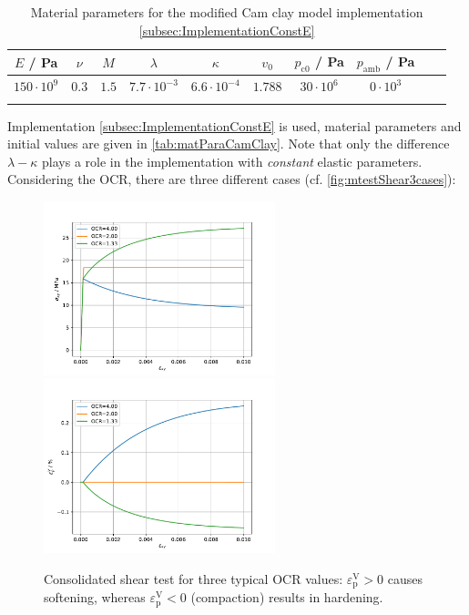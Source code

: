 \documentclass[paper=a4, twoside, pagesize]{scrartcl}
\renewcommand{\c}{\text{c}}
\newcommand{\p}{\text{p}}
\newcommand{\minus}{-}
\begin{document}
\begin{table}[h!]
  \centering
  \caption{Material parameters for the modified Cam clay model implementation \ref{subsec:ImplementationConstE}}
  \label{tab:matParaCamClay}
  \begin{tabular}{c c c c c c c c c c}
  \firsthline
    {$E$} / Pa & {$\nu$} & {$M$} & {$\lambda$} & {$\kappa$} & {$v_0$} & {$p_{\c0}$} / Pa & {$p_\text{amb}$} / Pa\\
    \hline
    $150\cdot10^{9}$ & $0.3$ & $1.5$ & $7.7\cdot 10^{\minus3}$ & $6.6\cdot 10^{\minus4}$ & $1.788$ & $30\cdot10^{6}$ & $0\cdot10^{3}$ \\
    \lasthline
  \end{tabular}
\end{table}
Implementation \ref{subsec:ImplementationConstE} is used, material parameters and initial values are given in \autoref{tab:matParaCamClay}. Note that only the difference $\lambda - \kappa$ plays a role in the implementation with \emph{constant} elastic parameters. Considering the OCR, there are three different cases (cf. \autoref{fig:mtestShear3cases}):
\begin{figure}[h!]
  \hspace{-10mm}
  \includegraphics[width=0.60\textwidth]{img/SemiExplicitModifiedCamClay_OpenGeoSys2023/ModCamClay_ParamStudy_ShearCurves_pStudy}
  \hspace{-10mm}
  \includegraphics[width=0.60\textwidth]{img/SemiExplicitModifiedCamClay_OpenGeoSys2023/ModCamClay_ParamStudy_eplVCurves_pStudy}
  \caption{Consolidated shear test for three typical OCR values: $\varepsilon_\p^\text{V}>0$ causes softening, whereas $\varepsilon_\p^\text{V}<0$ (compaction) results in hardening.}\label{fig:mtestShear3cases}
\end{figure}
\end{document}
